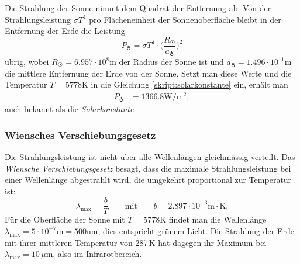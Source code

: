 Die Strahlung der Sonne nimmt dem Quadrat der Entfernung ab.
Von der Strahlungsleistung $\sigma T^4$ pro Flächeneinheit der
Sonnenoberfläche bleibt in der Entfernung der Erde die Leistung
\begin{equation}
P_{\earth}
=
\sigma T^4\cdot \biggl(\frac{R_{\astrosun}}{a_{\earth}}\biggr)^2
\label{skript:solarkonstante}
\end{equation}
übrig,
wobei $R_{\astrosun}=6.957\cdot 10^8\text{m}$ der Radius der Sonne ist und
$a_{\earth}=1.496\cdot 10^{11}\text{m}$ die mittlere Entfernung der Erde
von der Sonne.
Setzt man diese Werte und die Temperatur $T=5778\text{K}$ in die Gleichung
\eqref{skript:solarkonstante}
ein, erhält man
\begin{align*}
P_{\earth}
&=
1366.8 \text{W}/\text{m}^2,
\end{align*}
auch bekannt als die {\em Solarkonstante}.

\subsubsection{Wiensches Verschiebungsgesetz}
Die Strahlungsleistung ist nicht über alle Wellenlängen gleichmässig
verteilt.
Das {\em Wiensche Verschiebungsgesetz} besagt, dass die maximale
Strahlungsleistung bei einer Wellenlänge abgestrahlt wird,
die umgekehrt proportional zur Temperatur ist:
\begin{equation}
\lambda_{\text{max}}
=
\frac{b}{T}
\qquad\text{mit}\qquad
b=2.897\cdot10^{-3}\text{m}\cdot\text{K}.
\end{equation}
Für die Oberfläche der Sonne mit $T=5778\text{K}$ findet man die
Wellenlänge
$\lambda_{\text{max}}=5\cdot10^{-7}\text{m} = 500\text{nm}$,
dies entspricht grünem Licht.
Die Strahlung der Erde mit ihrer mittleren Temperatur von 287\,K
hat dagegen ihr Maximum bei $\lambda_{\text{max}}=10\,\mu\text{m}$,
also im Infrarotbereich.

